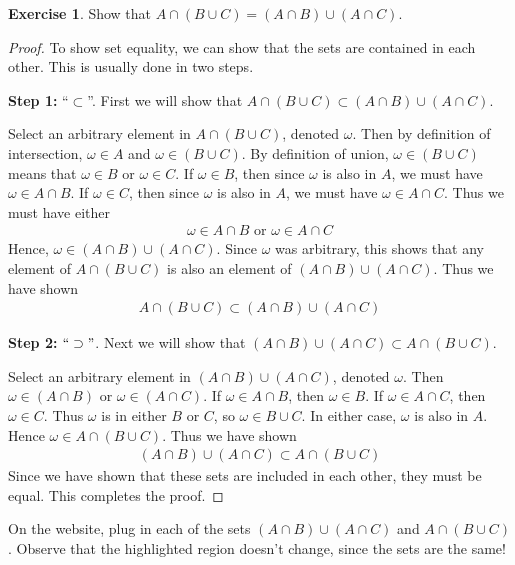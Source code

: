 \documentclass[11pt,letterpaper]{article}
\numberwithin{theorem}{section}
\numberwithin{definition}{section}
\numberwithin{lemma}{section}
\numberwithin{corollary}{section}
\numberwithin{proposition}{section}
\theoremstyle{definition}
\numberwithin{remark}{section}
\numberwithin{claim}{section}
\numberwithin{observation}{section}
\numberwithin{fact}{section}
\numberwithin{assumption}{section}
\numberwithin{example}{section}
\newtheorem{exercise}[theorem]{Exercise}
\numberwithin{exercise}{section}
\begin{document}
\begin{exercise}
Show that $A \cap (B \cup C) = (A \cap B) \cup (A \cap C)$.
\end{exercise}
\begin{proof}
To show set equality, we can show that the sets are contained in each other. This is usually done in two steps. 

\textbf{Step 1:} ``$\subset$''. First we will show that $A \cap (B \cup C) \subset (A \cap B) \cup (A \cap C)$. 

Select an arbitrary element in $A \cap (B \cup C)$, denoted $\omega$. Then by definition of intersection, $\omega \in A$ and $\omega \in (B \cup C)$. By definition of union, $\omega \in (B \cup C)$ means that $\omega \in B$ or $\omega \in C$. If $\omega \in B$, then since $\omega$ is also in $A$, we must have $\omega \in A \cap B$. If $\omega \in C$, then since $\omega$ is also in $A$, we must have $\omega \in A \cap C$. Thus we must have either
\begin{align*}
\omega \in A \cap B \text{ or } \omega \in A\cap C
\end{align*}
Hence, $\omega \in (A \cap B) \cup (A \cap C)$. Since $\omega$ was arbitrary, this shows that any element of $A \cap (B \cup C)$ is also an element of $(A \cap B) \cup (A \cap C)$. Thus we have shown
\begin{align*}
A \cap (B \cup C) \subset (A \cap B) \cup (A \cap C)
\end{align*}

\textbf{Step 2:} $``\supset"$. Next we will show that $(A \cap B) \cup (A \cap C) \subset A \cap (B \cup C)$.

Select an arbitrary element in $(A \cap B) \cup (A \cap C)$, denoted $\omega$. Then $\omega \in (A \cap B)$ or $\omega \in (A \cap C)$. If $\omega \in A \cap B$, then $\omega \in B$. If $\omega \in A \cap C$, then $\omega \in C$. Thus $\omega$ is in either $B$ or $C$, so $\omega \in B \cup C$. In either case, $\omega$ is also in $A$. Hence $\omega \in A \cap (B \cup C)$. Thus we have shown
\begin{align*}
(A \cap B) \cup (A \cap C) \subset A \cap (B \cup C)
\end{align*}
Since we have shown that these sets are included in each other, they must be equal. This completes the proof.
\end{proof}

On the website, plug in each of the sets $(A \cap B) \cup (A \cap C)$ and $A \cap (B \cup C)$. Observe that the highlighted region doesn't change, since the sets are the same!
\end{document}
